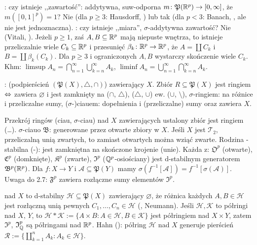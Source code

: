 :  czy istnieje ,,zawartość'': addytywna, suw-odporna $m \colon \mathfrak P (\mathbb{R}^p) \to [0, \infty]$, że $m([0,1]^p) = 1$?
Nie (dla $p \ge 3$: Hausdorff, ) lub tak (dla $p < 3$: Banach, , ale nie jest jednoznaczna).
: czy istnieje ,,miara'', $\sigma$-addytywna zawartość?
Nie (Vitali, ).
Jeżeli $p \ge 1$, zaś $A, B \subseteq \mathbb{R}^p$ mają niepuste wnętrza, to istnieje przeliczalnie wiele $C_k \subseteq \mathbb{R}^p$ i przesunięć $\beta_k \colon \mathbb{R}^p \to \mathbb{R}^p$, że $A = \coprod C_k$ i $B = \coprod \beta_k(C_k)$.
Dla $p \ge 3$ i ograniczonych $A,B$ wystarczy skończenie wiele $C_k$.
Khm: $\limsup A_n = \bigcap_{n=1}^\infty \bigcup_{k=n}^\infty A_k$, $\liminf A_n = \bigcup_{n=1}^\infty \bigcap_{k=n}^\infty A_k$.

:   (podpierścień $(\mathfrak P(X), \triangle, \cap)$) zawierający $X$.
Zbiór $R \subseteq \mathfrak P(X)$ jest ringiem $\Leftrightarrow$ zawiera $\varnothing$ i jest zamknięty na ($\cap$, $\triangle$), ($\triangle$, $\cup$) ew. ($\cup$, $\setminus$), $\sigma$-ringiem: na różnice i przeliczalne sumy, ($\sigma$-)ciauem: dopełnienia i (przeliczalne) sumy oraz zawiera $X$.

Przekrój  ringów (ciau, $\sigma$-ciau) nad $X$ zawierających ustalony zbiór jest ringiem (\ldots).
 $\sigma$-ciauo $\mathfrak B$: generowane przez otwarte zbiory w $X$.
Jeśli $X$ jest $\mathcal T_2$, przeliczalną unią zwartych, to zamiast otwartych można wziąć zwarte.
Rodzina -stabilna (-): jest zamkniętna na skończone krojenie (unie).
Każda z: $\mathfrak O^p$ (otwarte), $\mathfrak C^p$ (domknięte), $\mathfrak K^p$ (zwarte), $\mathfrak I^p$ ($\mathbb{Q}^p$-osiościany) jest d-stabilnym generatorem $\mathfrak B^p(\mathbb{R}^p)$.
Dla $f \colon X \to Y$ i $\mathcal A \subseteq \mathfrak P(Y)$ mamy $\sigma(f^{-1}[\mathcal A]) = f^{-1} [\sigma(\mathcal A)]$.
Uwaga do 2.7: $\mathfrak F^p$ zawiera rozłączne sumy elementów $\mathfrak I^p$.

  nad $X$ to d-stabilny $\mathcal H \subseteq \mathfrak P(X)$ zawierający $\varnothing$, że różnica każdych $A, B \in \mathcal H$ jest rozłączną unią pewnych $C_1, \ldots, C_n \in \mathcal H$ (, Neumann).
Jeśli $\mathcal H, \mathcal K$ to półringi nad $X$, $Y$, to $\mathcal H * \mathcal K := \{A \times B : A \in \mathcal H, B \in \mathcal K\}$ jest półringiem nad $X \times Y$, zatem $\mathfrak I^p$, $\mathfrak I^p_{\mathbb{Q}}$ są półringami nad $\mathbb{R}^p$.
Hahn (): półring $\mathcal H$ nad $X$ generuje pierścień $\mathcal R := \{\coprod_{k=1}^n A_k : A_k \in \mathcal H\}$. %

